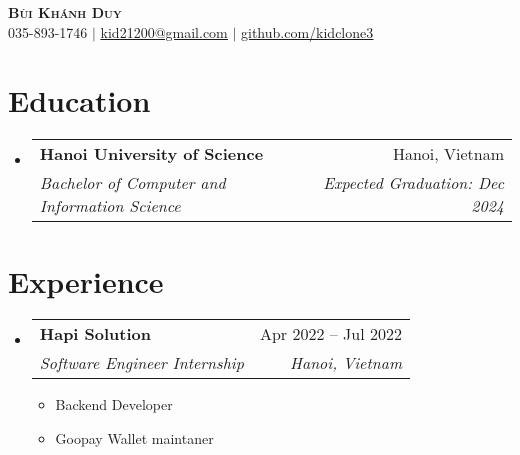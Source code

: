 \documentclass[letterpaper,11pt]{article}
\makeatletter
\newcommand{\resumeItem}[1]{
  \item\small{
    {#1 \vspace{-2pt}}
  }
}
\newcommand{\resumeSubheading}[4]{
  \vspace{-2pt}\item
    \begin{tabular*}{0.97\textwidth}[t]{l@{\extracolsep{\fill}}r}
      \textbf{#1} & #2 \\
      \textit{\small#3} & \textit{\small #4} \\
    \end{tabular*}\vspace{-7pt}
}
\newcommand{\resumeSubHeadingListStart}{\begin{itemize}[leftmargin=0.15in, label={}]}
\newcommand{\resumeSubHeadingListEnd}{\end{itemize}}
\newcommand{\resumeItemListStart}{\begin{itemize}}
\newcommand{\resumeItemListEnd}{\end{itemize}\vspace{-5pt}}
\makeatother
\begin{document}


\begin{center}
    \textbf{\Huge \scshape Bùi Khánh Duy} \\ \vspace{7pt}
    \small 035-893-1746 $|$ \href{mailto:kid21200@gmail.com}{\underline{kid21200@gmail.com}} $|$
    \href{https://github.com/kidclone3}{\underline{github.com/kidclone3}}
    \\\vspace{7pt}
\end{center}


\section{Education}
  \resumeSubHeadingListStart
    \resumeSubheading
      {Hanoi University of Science}{Hanoi, Vietnam}
      {Bachelor of Computer and Information Science}{Expected Graduation: Dec 2024}
            

  \resumeSubHeadingListEnd

\section{Experience}
  \resumeSubHeadingListStart

    \resumeSubheading
      {Hapi Solution}{Apr 2022 – Jul 2022}
      {Software Engineer Internship}{Hanoi, Vietnam}
      \resumeItemListStart
        \resumeItem{Backend Developer}
        \resumeItem{Goopay Wallet maintaner}
      \resumeItemListEnd
      
      
     
    \resumeSubHeadingListEnd
\end{document}

